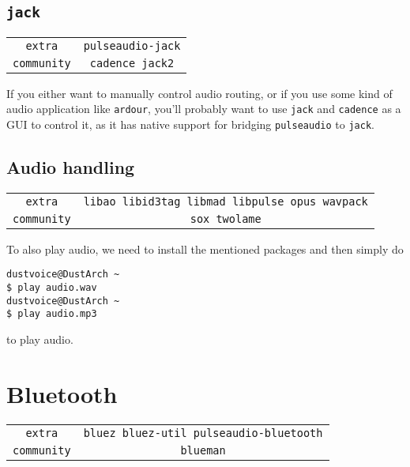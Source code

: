 \documentclass[9pt]{report}
\begin{document}
\vfill\eject

\hypertarget{x-jack}{\subsection{\texttt{jack}}}
\begin{center}
\begin{tabular}{|c|c|}
\hline
\texttt{extra} & \texttt{pulseaudio-jack} \\ 
\texttt{community} & \texttt{cadence jack2} \\ 
\hline
\end{tabular}
\end{center}

If you either want to manually control audio routing, or if you use some kind of audio application like \texttt{ardour}, you’ll probably want to use \texttt{jack} and \texttt{cadence} as a GUI to control it, as it has native support for bridging \texttt{pulseaudio} to \texttt{jack}.



\vfill\eject

\hypertarget{x-audio-handling}{\subsection{Audio handling}}
\begin{center}
\begin{tabular}{|c|c|}
\hline
\texttt{extra} & \texttt{libao libid3tag libmad libpulse opus wavpack} \\ 
\texttt{community} & \texttt{sox twolame} \\ 
\hline
\end{tabular}
\end{center}

To also play audio, we need to install the mentioned packages and then simply do


\begin{verbatim}
dustvoice@DustArch ~
$ play audio.wav
dustvoice@DustArch ~
$ play audio.mp3
\end{verbatim}

to play audio.



\vfill\eject

\hypertarget{x-bluetooth}{\section{Bluetooth}}
\begin{center}
\begin{tabular}{|c|c|}
\hline
\texttt{extra} & \texttt{bluez bluez-util pulseaudio-bluetooth} \\ 
\texttt{community} & \texttt{blueman} \\ 
\hline
\end{tabular}
\end{center}
\end{document}
